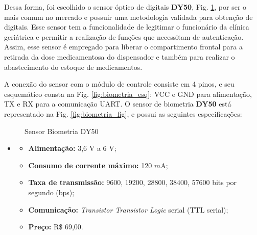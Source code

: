     Dessa forma, foi escolhido o sensor óptico de digitais \textbf{DY50}, Fig. \ref{fig:sensor_biometria}, por ser o mais comum no mercado e possuir uma metodologia validada para obtenção de digitais. Esse sensor tem a funcionalidade de legitimar o funcionário da clínica geriátrica e permitir a realização de funções que necessitam de autenticação. Assim, esse sensor é empregado para liberar o compartimento frontal para a retirada da dose medicamentosa do dispensador e também para realizar o abastecimento do estoque de medicamentos.
    
   A conexão do sensor com o módulo de controle consiste em 4 pinos, e seu esquemático consta na Fig. \ref{fig:biometria_esq}: VCC e GND para alimentação, TX e RX para a comunicação UART. O sensor de biometria \textbf{DY50} está representado na Fig. \ref{fig:biometria_fig}, e possui as seguintes especificações:
    
    
    \begin{figure}[H]
        \centering
        \hspace{0.1\textwidth}
        \caption{Sensor Biometria DY50}\label{fig:sensor_biometria}
    \end{figure}
    
    \begin{itemize}
    \item[ ]
        \begin{itemize}
            \item \textbf{Alimentação:} 3,6 V a 6 V;
            \item \textbf{Consumo de corrente máximo:} 120 $m$A;
            \item \textbf{Taxa de transmissão:} 9600, 19200, 28800, 38400, 57600 bits por segundo (bps);
            \item \textbf{Comunicação:} \textit{Transistor Transistor Logic} serial (TTL serial);
            \item \textbf{Preço:} R\$ 69,00.
        \end{itemize}
    \end{itemize}
    
